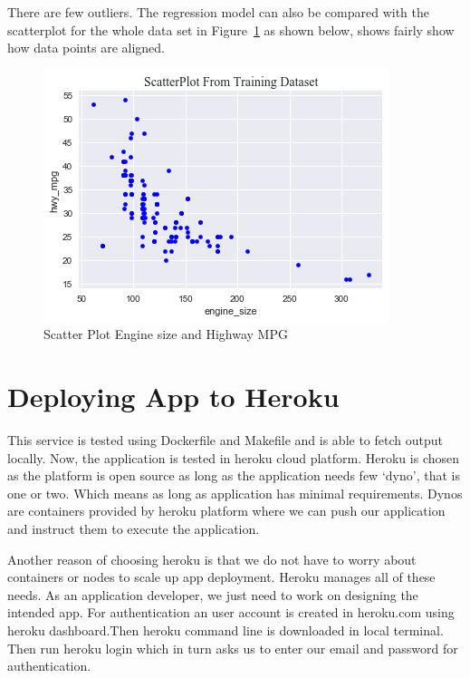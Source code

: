  
 There are few outliers. The regression model can also be compared with 
 the scatterplot for the whole data set
 in Figure~\ref{fig:scatterplt} as shown below, shows fairly show how data 
 points are aligned.
 
  \begin{figure}[h!]
  \includegraphics[width=\columnwidth]{images/scatterplot.png}
  \caption{Scatter Plot Engine size and Highway MPG}
\label{fig:scatterplt}
\end{figure} 
 
\section{Deploying App to Heroku} 

This service is tested using Dockerfile and Makefile and is able to fetch
output locally. Now, the application is tested in heroku cloud platform. Heroku
is chosen as the platform is open source as long as the application needs few 
`dyno', that is one or two. Which means as long as application has minimal
requirements. Dynos are containers provided by heroku platform where we can 
push our application and instruct them to execute the application.

Another reason of choosing heroku is that we do not have to worry about 
containers or nodes to scale up app deployment. Heroku manages all of these
needs. As an application developer, we just need to work on designing the 
intended app. For authentication an user account is created in heroku.com
using heroku dashboard.Then heroku command line is downloaded in local terminal.
Then run heroku login which in turn asks us to enter our email and password
for authentication.

